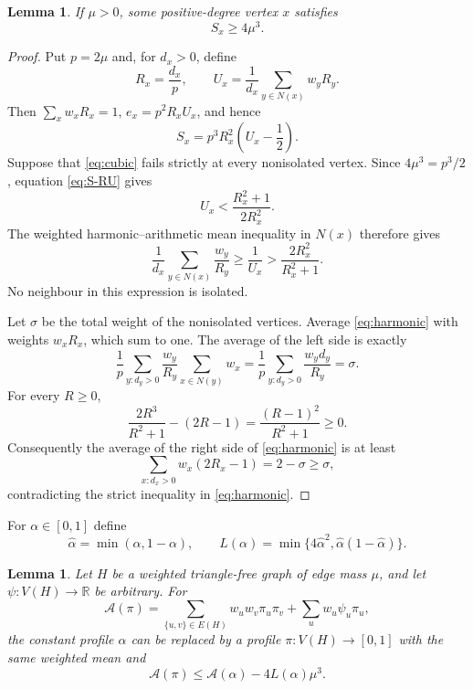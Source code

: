 \documentclass[11pt,reqno]{amsart}
\theoremstyle{plain}
\newtheorem{lemma}[theorem]{Lemma}
\newcommand{\Nb}{N}
\begin{document}
\begin{lemma}\label{lem:cubic}
If $\mu>0$, some positive-degree vertex $x$ satisfies
\begin{equation}\label{eq:cubic}
 S_x\ge4\mu^3.
\end{equation}
\end{lemma}

\begin{proof}
Put $p=2\mu$ and, for $d_x>0$, define
\[
 R_x=\frac{d_x}{p},\qquad
 U_x=\frac1{d_x}\sum_{y\in\Nb(x)}w_yR_y.
\]
Then $\sum_xw_xR_x=1$, $e_x=p^2R_xU_x$, and hence
\begin{equation}\label{eq:S-RU}
 S_x=p^3R_x^2\left(U_x-\frac12\right).
\end{equation}
Suppose that \eqref{eq:cubic} fails strictly at every nonisolated vertex.
Since $4\mu^3=p^3/2$, equation \eqref{eq:S-RU} gives
\[
 U_x<\frac{R_x^2+1}{2R_x^2}.
\]
The weighted harmonic--arithmetic mean inequality in $\Nb(x)$ therefore
gives
\begin{equation}\label{eq:harmonic}
 \frac1{d_x}\sum_{y\in\Nb(x)}\frac{w_y}{R_y}
 \ge\frac1{U_x}>
 \frac{2R_x^2}{R_x^2+1}.
\end{equation}
No neighbour in this expression is isolated.

Let $\sigma$ be the total weight of the nonisolated vertices.  Average
\eqref{eq:harmonic} with weights $w_xR_x$, which sum to one.  The average of
the left side is exactly
\[
 \frac1p\sum_{y:d_y>0}\frac{w_y}{R_y}
 \sum_{x\in\Nb(y)}w_x
 =\frac1p\sum_{y:d_y>0}\frac{w_yd_y}{R_y}=\sigma.
\]
For every $R\ge0$,
\[
 \frac{2R^3}{R^2+1}-(2R-1)
 =\frac{(R-1)^2}{R^2+1}\ge0.
\]
Consequently the average of the right side of \eqref{eq:harmonic} is at
least
\[
 \sum_{x:d_x>0}w_x(2R_x-1)=2-\sigma\ge\sigma,
\]
contradicting the strict inequality in \eqref{eq:harmonic}.
\end{proof}

For $\alpha\in[0,1]$ define
\[
 \hat\alpha=\min(\alpha,1-\alpha),\qquad
 L(\alpha)=\min\{4\hat\alpha^{2},\hat\alpha(1-\hat\alpha)\}.
\]

\begin{lemma}\label{lem:onestep}
Let $H$ be a weighted triangle-free graph of edge mass $\mu$, and let
$\psi:V(H)\to\mathbb R$ be arbitrary.  For
\[
 \mathcal A(\pi)=\sum_{\{u,v\}\in E(H)}w_uw_v\pi_u\pi_v
 +\sum_uw_u\psi_u\pi_u,
\]
the constant profile $\alpha$ can be replaced by a profile
$\pi:V(H)\to[0,1]$ with the same weighted mean and
\begin{equation}\label{eq:onestep}
 \mathcal A(\pi)\le\mathcal A(\alpha)-4L(\alpha)\mu^3.
\end{equation}
\end{lemma}
\end{document}
